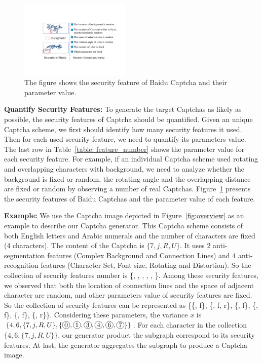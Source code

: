 \begin{figure}
  \centering
  \includegraphics[width=0.47\textwidth]{fig/captcha_analysis.pdf}
  \caption{The figure shows the security feature of Baidu Captcha and their parameter value.}
  \label{fig: captcha_analysis}
\end{figure}

\noindent \textbf{Quantify Security Features:} To generate the target Captchas as likely as possible, the security features of Captcha should be quantified. Given an unique Captcha scheme, we first should identify how many security features it used. Then for each used security feature, we need to quantify its parameters value. The last row in Table~\ref{table: feature_number} shows the parameter value for each security feature. For example, if an individual Captcha scheme used rotating and overlapping characters with background, we need to analyze whether the background is fixed or random, the rotating angle and the overlapping distance are fixed or random by observing a number of real Captchas. Figure~\ref{fig: captcha_analysis} presents the security features of Baidu Captchas and the parameter value of each feature.

\noindent \textbf{Example:} We use the Captcha image depicted in Figure~\ref{fig:overview} as an example to describe our Captcha generator. This Captcha scheme consists of both English letters and Arabic numerals and the number of characters are fixed (4 characters). The content of the Captcha is $\{7, j, R, U\}$.
It uses 2 anti-segmentation features (Complex Background and Connection Lines) and 4 anti-recognition features (Character Set, Font size, Rotating and Distortion). So the collection of security features number is \{, , , , , \}.
Among these security features, we observed that both the location of connection lines and the space of adjacent character are random, and other parameters value of security features are fixed. So the collection of security features can be represented as \{\{, f\}, \{, f, r\}, \{, f\}, \{, f\}, \{, f\}, \{, r\}\}.
Considering these parameters, the variance $x$ is $\{4, 6, \{7, j, R, U\}, \{\circled{\small 0}, \circled{\small 1}, \circled{\small 3}, \circled{\small 4}, \circled{\small 6}, \circled{\small 7}\}\}$.
For each character in the collection $\{4, 6, \{7, j, R, U\}\}$, our generator product the subgraph correspond to its security features. At last, the generator aggregates the subgraph to produce a Captcha image.

